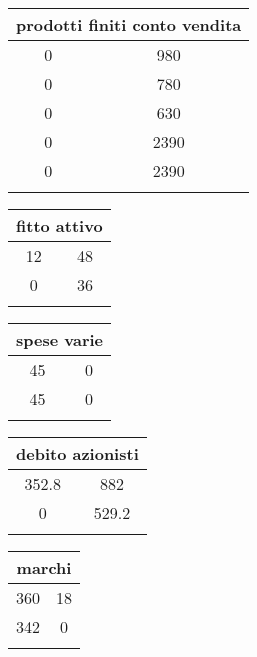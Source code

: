 \documentclass[twocolumn]{article}
\begin{document}
\begin{table}[ht]\centering 
\begin{tabular}{|c|c|}
\hline
\multicolumn{2}{|c|}{prodotti finiti conto vendita} \\ 
\hline 0 & 980 \\ 
0 & 780 \\ 
0 & 630 \\ 
 \hline 
0 & 2390 \\ 
\hline
0 & 2390 \\ 
 \\ 
\hline
\end{tabular} \end{table} 
\begin{table}[ht]\centering 
\begin{tabular}{|c|c|}
\hline
\multicolumn{2}{|c|}{fitto attivo} \\ 
\hline  \hline 
12 & 48 \\ 
\hline
0 & 36 \\ 
 \\ 
\hline
\end{tabular} \end{table} 
\begin{table}[ht]\centering 
\begin{tabular}{|c|c|}
\hline
\multicolumn{2}{|c|}{spese varie} \\ 
\hline  \hline 
45 & 0 \\ 
\hline
45 & 0 \\ 
 \\ 
\hline
\end{tabular} \end{table} 
\begin{table}[ht]\centering 
\begin{tabular}{|c|c|}
\hline
\multicolumn{2}{|c|}{debito azionisti} \\ 
\hline  \hline 
352.8 & 882 \\ 
\hline
0 & 529.2 \\ 
 \\ 
\hline
\end{tabular} \end{table} 
\begin{table}[ht]\centering 
\begin{tabular}{|c|c|}
\hline
\multicolumn{2}{|c|}{marchi} \\ 
\hline  \hline 
360 & 18 \\ 
\hline
342 & 0 \\ 
 \\ 
\hline
\end{tabular} \end{table} 
\end{document}
